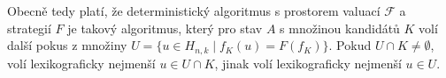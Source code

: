 Obecně tedy platí, že deterministický algoritmus s prostorem valuací $\mathcal{F}$ a strategií $F$ je takový algoritmus, který pro stav $A$ s množinou kandidátů $K$ volí další pokus z množiny $U = \{u \in H_{n,k} \mid f_K(u) = F(f_K)\}$. Pokud $U \cap K \neq \emptyset$, volí lexikograficky nejmenší $u \in U \cap K$, jinak volí lexikograficky nejmenší $u \in U$. 




    





